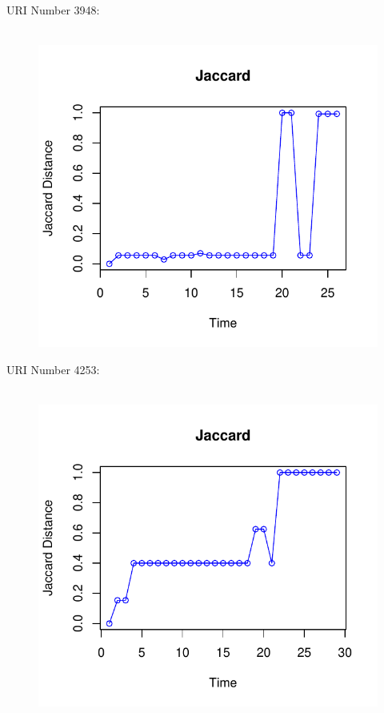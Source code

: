 \documentclass[12pt]{article}
\begin{document}
URI Number 3948:\\
\begin{figure}[H]
    \centering
    \includegraphics[scale=0.7]{3948.pdf}
\end{figure}

URI Number 4253:\\
\begin{figure}[H]
    \centering
    \includegraphics[scale=0.7]{4253.pdf}
\end{figure}
\end{document}
